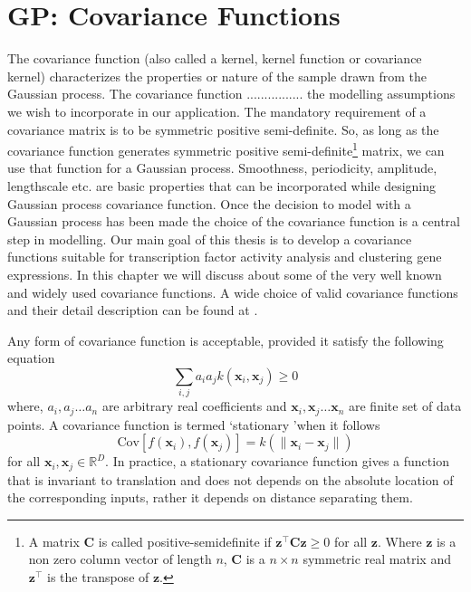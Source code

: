\section{GP: Covariance Functions}
The covariance function (also called a kernel, kernel function or covariance kernel) characterizes the properties or nature of the sample drawn from the Gaussian process. The covariance function ................ the modelling assumptions we wish to incorporate in our application. The mandatory requirement of a covariance matrix is to be symmetric positive semi-definite. So, as long as the covariance function generates symmetric positive semi-definite\footnote{A matrix $\textbf{C}$ is called positive-semidefinite if $\textbf{z}^{\top}\textbf{C}\textbf{z} \geq 0$ for all $\textbf{z}$. Where $\textbf{z}$ is a non zero column vector of length $n$, $\textbf{C}$ is a $n\times n$ symmetric real matrix and $\textbf{z}^{\top}$ is the transpose of $\textbf{z}$.} matrix, we can use that function for a Gaussian process. Smoothness, periodicity, amplitude, lengthscale etc. are basic properties that can be incorporated while designing Gaussian process covariance function. Once the decision to model with a Gaussian process has been made the choice of the covariance function is a central step in modelling. Our main goal of this thesis is to develop a covariance functions suitable for transcription factor activity analysis and clustering gene expressions. In this chapter we will discuss about some of the very well known and widely used covariance functions. A wide choice of valid covariance functions and their detail description can be found at \cite{Rasmussen_and_Williams:2006}.

Any form of covariance function is acceptable, provided it satisfy the following equation
\begin{equation} \label{eq:cov_basic}
\sum_{i,j} a_i a_j k\left(\textbf{x}_i,\textbf{x}_j\right)\geq 0
\end{equation}
where, $a_i, a_j \dots a_n$ are arbitrary real coefficients and $\textbf{x}_i, \textbf{x}_j \dots \textbf{x}_n$ are finite set of data points. A covariance function is termed \lq stationary \rq when it follows
\begin{equation} \label{eq:cov_stationary}
\text{Cov}\left[f\left(\textbf{x}_i\right),f\left(\textbf{x}_j\right)\right] = k\left( \lVert \textbf{x}_i -\textbf{x}_j \rVert \right)
\end{equation}
for all $\textbf{x}_i,\textbf{x}_j \in \mathbb{R}^D$. In practice, a stationary covariance function  gives a function that is invariant to translation and does not depends on the absolute location of the corresponding inputs, rather it depends on distance separating them. 

